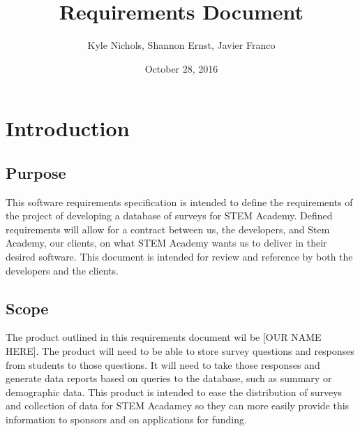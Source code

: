 \documentclass[letterpaper,10pt,titlepage, draftclsnofoot,onecolumn]{IEEEtran}
\begin{document}
\title{Requirements Document}
\author{Kyle Nichols, Shannon Ernst, Javier Franco}
\date{October 28, 2016}
\maketitle
\section{Introduction}
\subsection{Purpose}
This software requirements specification is intended to define the requirements of the project of developing a database 
of surveys for STEM Academy. Defined requirements will allow for a contract between us, the developers, and Stem Academy, 
our clients, on what STEM Academy wants us to deliver in their desired software. This document is intended for review and
reference by both the developers and the clients.
\subsection{Scope}
The product outlined in this requirements document wil be [OUR NAME HERE]. The product will need to be able to store survey
questions and responses from students to those questions. It will need to take those responses and generate data reports
based on queries to the database, such as summary or demographic data. This product is intended to ease the distribution of
surveys and collection of data for STEM Acadamey so they can more easily provide this information to sponsors and on
applications for funding. %
\end{document}
